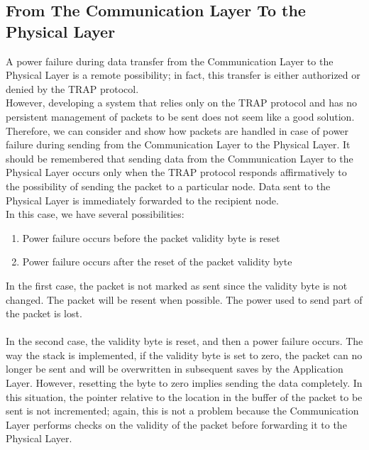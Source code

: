\subsection{From The Communication Layer To the Physical Layer}
A power failure during data transfer from the Communication Layer to the Physical Layer is a remote possibility; in fact, this transfer is either authorized or denied by the TRAP protocol.\\
However, developing a system that relies only on the TRAP protocol and has no persistent management of packets to be sent does not seem like a good solution.\\
Therefore, we can consider and show how packets are handled in case of power failure during sending from the Communication Layer to the Physical Layer. It should be remembered that sending data from the Communication Layer to the Physical Layer occurs only when the TRAP protocol responds affirmatively to the possibility of sending the packet to a particular node. Data sent to the Physical Layer is immediately forwarded to the recipient node.\\
In this case, we have several possibilities:
\begin{enumerate}
\item Power failure occurs before the packet validity byte is reset
\item Power failure occurs after the reset of the packet validity byte
\end{enumerate}
In the first case, the packet is not marked as sent since the validity byte is not changed. The packet will be resent when possible. The power used to send part of the packet is lost.\\\\
In the second case, the validity byte is reset, and then a power failure occurs. The way the stack is implemented, if the validity byte is set to zero, the packet can no longer be sent and will be overwritten in subsequent saves by the Application Layer. However, resetting the byte to zero implies sending the data completely. In this situation, the pointer relative to the location in the buffer of the packet to be sent is not incremented; again, this is not a problem because the Communication Layer performs checks on the validity of the packet before forwarding it to the Physical Layer.
